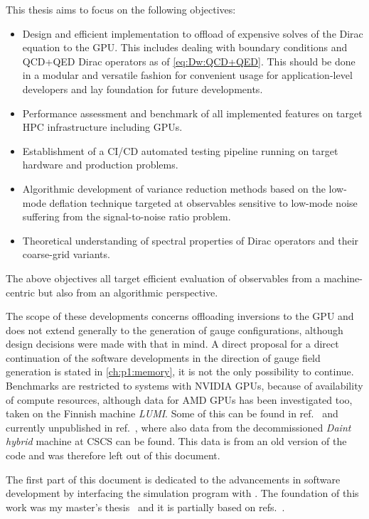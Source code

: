 This thesis aims to focus on the following objectives:
\begin{itemize}
   \item Design and efficient implementation to offload of expensive solves of the Dirac equation to the GPU. This includes dealing with \Cstar boundary conditions and QCD+QED Dirac operators as of \cref{eq:Dw:QCD+QED}. This should be done in a modular and versatile fashion for convenient usage for application-level developers and lay foundation for future developments.
   \item Performance assessment and benchmark of all implemented features on target HPC infrastructure including GPUs.
   \item Establishment of a CI/CD automated testing pipeline running on target hardware and production problems.
   \item Algorithmic development of variance reduction methods based on the low-mode deflation technique targeted at observables sensitive to low-mode noise suffering from the signal-to-noise ratio problem.
   \item Theoretical understanding of spectral properties of Dirac operators and their coarse-grid variants.
\end{itemize}
The above objectives all target efficient evaluation of observables from a machine-centric but also from an algorithmic perspective.

The scope of these developments concerns offloading inversions to the GPU and does not extend generally to the generation of gauge configurations, although design decisions were made with that in mind.
A direct proposal for a direct continuation of the software developments in the direction of gauge field generation is stated in \cref{ch:p1:memory}, it is not the only possibility to continue.
Benchmarks are restricted to systems with NVIDIA GPUs, because of availability of compute resources, although data for AMD GPUs has been investigated too, taken on the Finnish machine \emph{LUMI}.
Some of this can be found in ref.~ and currently unpublished in ref.~, where also data from the decommissioned \emph{Daint hybrid} machine at CSCS can be found.
This data is from an old version of the code and was therefore left out of this document.

The first part of this document is dedicated to the advancements in software development by interfacing the simulation program \openqxd with \quda.
The foundation of this work was my master's thesis~ and it is partially based on refs.~.

